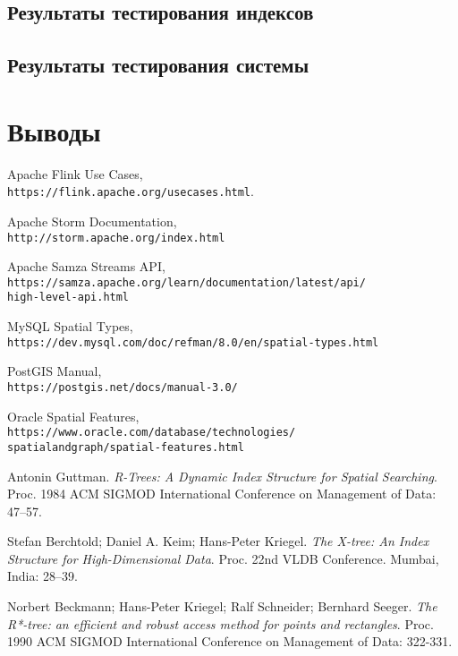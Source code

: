 \documentclass[14pt]{article}
\begin{document}
\subsection{Результаты тестирования индексов}
\subsection{Результаты тестирования системы}

\section{Выводы}

\begin{thebibliography}{9}
Apache Flink Use Cases,\\
\texttt{https://flink.apache.org/usecases.html}.

Apache Storm Documentation,\\
\texttt{http://storm.apache.org/index.html}

Apache Samza Streams API,\\
\texttt{https://samza.apache.org/learn/documentation/latest/api/\\high-level-api.html}

MySQL Spatial Types,\\
\texttt{https://dev.mysql.com/doc/refman/8.0/en/spatial-types.html}

PostGIS Manual,\\
\texttt{https://postgis.net/docs/manual-3.0/}

Oracle Spatial Features,\\
\texttt{https://www.oracle.com/database/technologies/\\spatialandgraph/spatial-features.html}

Antonin Guttman. \textit{R-Trees: A Dynamic Index Structure for Spatial Searching}. Proc. 1984 ACM SIGMOD International Conference on Management of Data: 47–57.

Stefan Berchtold; Daniel A. Keim; Hans-Peter Kriegel. \textit{The X-tree: An Index Structure for High-Dimensional Data}. Proc. 22nd VLDB Conference. Mumbai, India: 28–39.

Norbert Beckmann; Hans-Peter Kriegel; Ralf Schneider; Bernhard Seeger. \textit{The R*-tree: an efficient and robust access method for points and rectangles}. Proc. 1990 ACM SIGMOD International Conference on Management of Data: 322-331.


\end{thebibliography}
\end{document}
